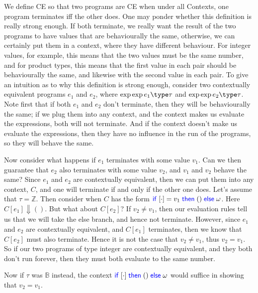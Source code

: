 \documentclass[twoside,11pt,openright]{report}
\theoremstyle{definition}
\newcommand{\Keyword}[1]{{\color{blue} \mathsf{#1}}}
\newcommand{\expr}{e}
\newcommand{\val}{v}
\newcommand{\TT}{()}
\newcommand{\IfCmd}{\Keyword{if}}
\newcommand{\ThenCmd}{\Keyword{then}}
\newcommand{\ElseCmd}{\Keyword{else}}
\def\If#1then#2else#3{\IfCmd{}\;#1\;\ThenCmd{}\;#2\;\ElseCmd{}\;#3}
\newcommand{\empctx}{[\cdot]}
\newcommand{\ctx}{C}
\newcommand{\Tint}{\mathbb{Z}}
\newcommand{\Tbool}{\mathbb{B}}
\newcommand{\typ}{\tau}
\newcommand{\empvenv}{\bullet}
\newcommand{\emptenv}{\bullet}
\newcommand{\jdg}[4]{#1 \; | \; #2 \; \vdash #3 : #4}
\def\envs#1#2\exp#3\type#4{\jdg{#1}{#2}{#3}{#4}} %
\begin{document}
We define CE so that two programs are CE when under all Contexts, one program terminates iff the other does. One may ponder whether this definition is really strong enough. If both terminate, we really want the result of the two programs to have values that are behaviourally the same, otherwise, we can certainly put them in a context, where they have different behaviour.
For integer values, for example, this means that the two values must be the same number, and for product types, this means that the first value in each pair should be behaviourally the same, and likewise with the second value in each pair.
To give an intuition as to  why this definition is strong enough, consider two contextually equivalent programs $\expr_1$ and $\expr_2$, where $\envs \emptenv \empvenv \exp \expr_1 \type \typ$ and $\envs \emptenv \empvenv \exp \expr_2 \type \typ$.
Note first that if both $\expr_1$ and $\expr_2$ don't terminate, then they will be behaviourally the same; if we plug them into any context, and the context makes us evaluate the expressions, both will not terminate. And if the context doesn't make us evaluate the expressions, then they have no influence in the run of the programs, so they will behave the same.

Now consider what happens if $\expr_1$ terminates with some value $\val_1$. Can we then guarantee that $\expr_2$ also terminates with some value $\val_2$, and $\val_1$ and $\val_2$ behave the same? Since $\expr_1$ and $\expr_2$ are contextually equivalent, then we can put them into any context, $\ctx$, and one will terminate if and only if the other one does.
Let's assume that $\typ = \Tint$. Then consider when $\ctx$ has the form $\If \empctx = \val_1 then \TT else \omega$. Here $\ctx[\expr_1] \Downarrow \TT$. But what about $\ctx[\expr_2]$? If $\val_2 \neq \val_1$, then our evaluation rules tell us that we will take the else branch, and hence not terminate. However, since $\expr_1$ and $\expr_2$ are contextually equivalent, and $\ctx[\expr_1]$ terminates, then we know that $\ctx[\expr_2]$ must also terminate. Hence it is not the case that $\val_2 \neq \val_1$, thus $\val_2 = \val_1$. So if our two programs of type integer are contextually equivalent, and they both don't run forever, then they must both evaluate to the same number.

Now if $\typ$ was $\Tbool$ instead, the context $\If \empctx then \TT else \omega$ would suffice in showing that $\val_2 = \val_1$. 
\end{document}
